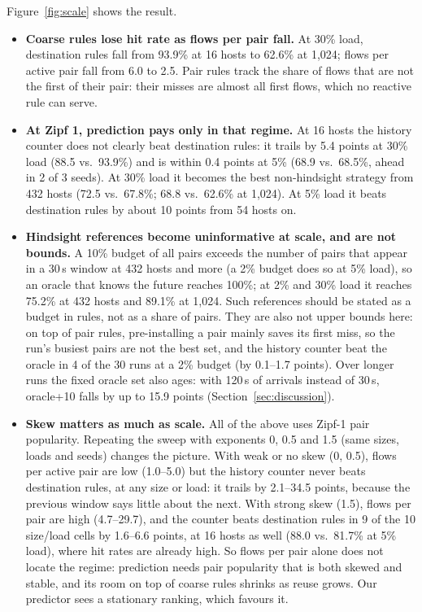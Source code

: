 \documentclass[sigconf]{acmart}
\begin{document}
Figure~\ref{fig:scale} shows the result.
\begin{itemize}
\item \textbf{Coarse rules lose hit rate as flows per pair fall.} At 30\% load, destination rules fall from 93.9\% at 16 hosts to 62.6\% at 1,024; flows per active pair fall from 6.0 to 2.5. Pair rules track the share of flows that are not the first of their pair: their misses are almost all first flows, which no reactive rule can serve.
\item \textbf{At Zipf 1, prediction pays only in that regime.} At 16 hosts the history counter does not clearly beat destination rules: it trails by 5.4 points at 30\% load (88.5 vs.\ 93.9\%) and is within 0.4 points at 5\% (68.9 vs.\ 68.5\%, ahead in 2 of 3 seeds). At 30\% load it becomes the best non-hindsight strategy from 432 hosts (72.5 vs.\ 67.8\%; 68.8 vs.\ 62.6\% at 1,024). At 5\% load it beats destination rules by about 10 points from 54 hosts on.
\item \textbf{Hindsight references become uninformative at scale, and are not bounds.} A 10\% budget of all pairs exceeds the number of pairs that appear in a 30\,s window at 432 hosts and more (a 2\% budget does so at 5\% load), so an oracle that knows the future reaches 100\%; at 2\% and 30\% load it reaches 75.2\% at 432 hosts and 89.1\% at 1,024. Such references should be stated as a budget in rules, not as a share of pairs. They are also not upper bounds here: on top of pair rules, pre-installing a pair mainly saves its first miss, so the run's busiest pairs are not the best set, and the history counter beat the oracle in 4 of the 30 runs at a 2\% budget (by 0.1--1.7 points). Over longer runs the fixed oracle set also ages: with 120\,s of arrivals instead of 30\,s, oracle+10 falls by up to 15.9 points (Section~\ref{sec:discussion}).
\item \textbf{Skew matters as much as scale.} All of the above uses Zipf-1 pair popularity. Repeating the sweep with exponents 0, 0.5 and 1.5 (same sizes, loads and seeds) changes the picture. With weak or no skew (0, 0.5), flows per active pair are low (1.0--5.0) but the history counter never beats destination rules, at any size or load: it trails by 2.1--34.5 points, because the previous window says little about the next. With strong skew (1.5), flows per pair are high (4.7--29.7), and the counter beats destination rules in 9 of the 10 size/load cells by 1.6--6.6 points, at 16 hosts as well (88.0 vs.\ 81.7\% at 5\% load), where hit rates are already high. So flows per pair alone does not locate the regime: prediction needs pair popularity that is both skewed and stable, and its room on top of coarse rules shrinks as reuse grows. Our predictor sees a stationary ranking, which favours it.
\end{itemize}
\end{document}
